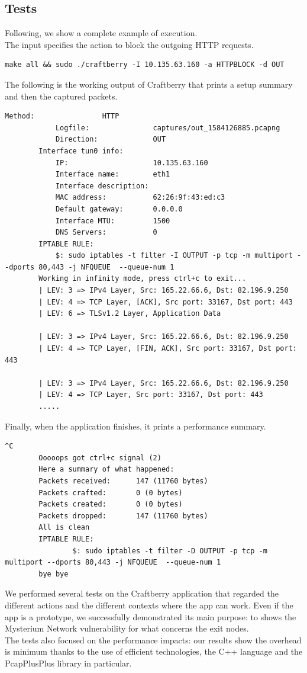 \documentclass[12pt]{article}
\begin{document}
	\subsection{Tests}
		Following, we show a complete example of execution.\\
		The input specifies the action to block the outgoing HTTP requests.
		\bigbreak
		\begin{lstlisting}[frame=single]
		make all && sudo ./craftberry -I 10.135.63.160 -a HTTPBLOCK -d OUT
		\end{lstlisting}
		\bigbreak
		The following is the working output of Craftberry that prints a setup summary and then the captured packets.
		\bigbreak
		\begin{lstlisting}[frame=single]
		Method:                HTTP
			Logfile:               captures/out_1584126885.pcapng
			Direction:             OUT
		Interface tun0 info:
			IP:                    10.135.63.160
			Interface name:        eth1
			Interface description: 
			MAC address:           62:26:9f:43:ed:c3
			Default gateway:       0.0.0.0
			Interface MTU:         1500
			DNS Servers:           0
		IPTABLE RULE: 
			$: sudo iptables -t filter -I OUTPUT -p tcp -m multiport --dports 80,443 -j NFQUEUE  --queue-num 1
		Working in infinity mode, press ctrl+c to exit...
		| LEV: 3 => IPv4 Layer, Src: 165.22.66.6, Dst: 82.196.9.250
		| LEV: 4 => TCP Layer, [ACK], Src port: 33167, Dst port: 443
		| LEV: 6 => TLSv1.2 Layer, Application Data

		| LEV: 3 => IPv4 Layer, Src: 165.22.66.6, Dst: 82.196.9.250
		| LEV: 4 => TCP Layer, [FIN, ACK], Src port: 33167, Dst port: 443

		| LEV: 3 => IPv4 Layer, Src: 165.22.66.6, Dst: 82.196.9.250
		| LEV: 4 => TCP Layer, Src port: 33167, Dst port: 443
		.....
		\end{lstlisting}

		\bigbreak
		Finally, when the application finishes, it prints a performance summary.
		\begin{lstlisting}[frame=single]
		^C
		Ooooops got ctrl+c signal (2)
		Here a summary of what happened:
		Packets received:      147 (11760 bytes)
		Packets crafted:       0 (0 bytes)
		Packets created:       0 (0 bytes)
		Packets dropped:       147 (11760 bytes)
		All is clean
		IPTABLE RULE: 
				$: sudo iptables -t filter -D OUTPUT -p tcp -m multiport --dports 80,443 -j NFQUEUE  --queue-num 1
		bye bye
		\end{lstlisting}
		\bigbreak
		We performed several tests on the Craftberry application that regarded the different actions and the different contexts where the app can work. Even if the app is a prototype, we successfully demonstrated its main purpose: to shows the Mysterium Network vulnerability for what concerns the exit nodes.\\
		The tests also focused on the performance impacts: our results show the overhead is minimum thanks to the use of efficient technologies, the C++ language and the PcapPlusPlus library in particular.
		
\end{document}
